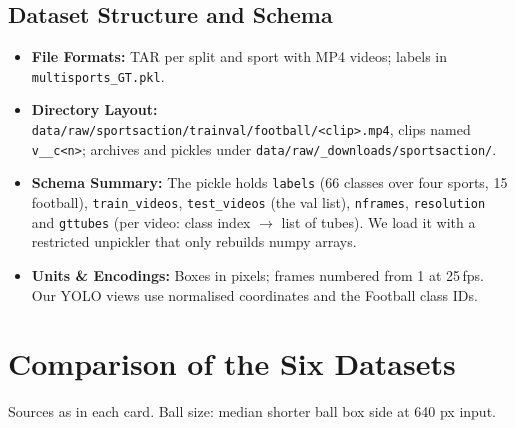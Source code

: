 \documentclass[11pt, a4paper]{article}
\newif\ifreportednoted
\newcommand{\resetreported}{\global\reportednotedfalse}
\begin{document}
\subsection{Dataset Structure and Schema}
\begin{itemize}
    \item \textbf{File Formats:} TAR per split and sport with MP4 videos; labels in \texttt{multisports\_GT.pkl}.
    \item \textbf{Directory Layout:} \sloppy\texttt{data/raw/}\allowbreak\texttt{sportsaction/}\allowbreak\texttt{trainval/}\allowbreak\texttt{football/}\allowbreak\texttt{<clip>.mp4}, clips named \texttt{v\_<YouTube ID>\_c<n>}; archives and pickles under \texttt{data/raw/}\allowbreak\texttt{\_downloads/}\allowbreak\texttt{sportsaction/}.
    \item \textbf{Schema Summary:} \sloppy The pickle holds \texttt{labels} (66 classes over four sports, 15 football), \texttt{train\_videos}, \texttt{test\_videos} (the val list), \texttt{nframes}, \texttt{resolution} and \texttt{gttubes} (per video: class index $\rightarrow$ list of tubes). We load it with a restricted unpickler that only rebuilds numpy arrays.
    \item \textbf{Units \& Encodings:} Boxes in pixels; frames numbered from 1 at 25\,fps. Our YOLO views use normalised coordinates and the Football class IDs.
\end{itemize}

\section{Comparison of the Six Datasets}
\resetreported

\noindent Sources as in each card. Ball size: median shorter ball box side at 640 px input.
\end{document}
